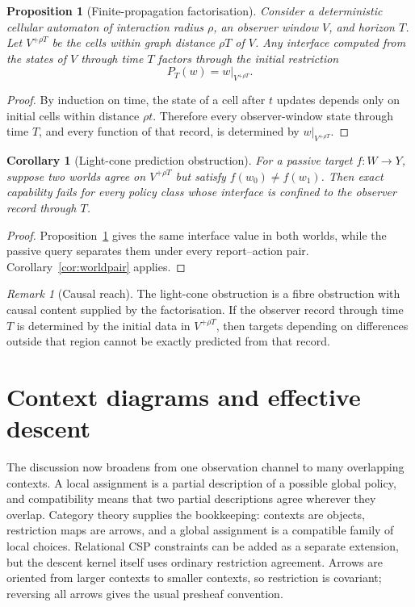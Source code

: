\documentclass[11pt]{article}
\theoremstyle{plain}
\newtheorem{proposition}[theorem]{Proposition}
\newtheorem{corollary}[theorem]{Corollary}
\theoremstyle{definition}
\theoremstyle{remark}
\newtheorem{remark}[theorem]{Remark}
\begin{document}
\begin{proposition}[Finite-propagation factorisation]\label{prop:lightcone}
Consider a deterministic cellular automaton of interaction radius $\rho$, an
observer window $V$, and horizon $T$. Let
$V^{+\rho T}$ be the cells within graph distance $\rho T$ of $V$. Any interface
computed from the states of $V$ through time $T$ factors through the initial
restriction
\[
P_T(w)=w|_{V^{+\rho T}}.
\]
\end{proposition}

\begin{proof}
By induction on time, the state of a cell after $t$ updates depends only on
initial cells within distance $\rho t$. Therefore every observer-window state
through time $T$, and every function of that record, is determined by
$w|_{V^{+\rho T}}$.
\end{proof}

\begin{corollary}[Light-cone prediction obstruction]\label{cor:lightcone}
For a passive target $f:W\to Y$, suppose two worlds agree on
$V^{+\rho T}$ but satisfy $f(w_0)\ne f(w_1)$. Then exact capability fails for
every policy class whose interface is confined to the observer record through
$T$.
\end{corollary}

\begin{proof}
Proposition~\ref{prop:lightcone} gives the same interface value in both worlds,
while the passive query separates them under every report--action pair.
Corollary~\ref{cor:worldpair} applies.
\end{proof}

\begin{remark}[Causal reach]
The light-cone obstruction is a fibre obstruction with causal content supplied by
the factorisation. If the observer record through time $T$ is determined by the
initial data in $V^{+\rho T}$, then targets depending on differences outside that
region cannot be exactly predicted from that record.
\end{remark}

\section{Context diagrams and effective descent}\label{sec:descent}

The discussion now broadens from one observation channel to many overlapping
contexts. A local assignment is a partial description of a possible global
policy, and compatibility means that two partial descriptions agree wherever
they overlap. Category theory supplies the bookkeeping: contexts are objects,
restriction maps are arrows, and a global assignment is a compatible family of
local choices. Relational CSP constraints can be added as a separate extension,
but the descent kernel itself uses ordinary restriction agreement. Arrows are
oriented from larger contexts to smaller contexts, so restriction is covariant;
reversing all arrows gives the usual presheaf convention.
\end{document}

